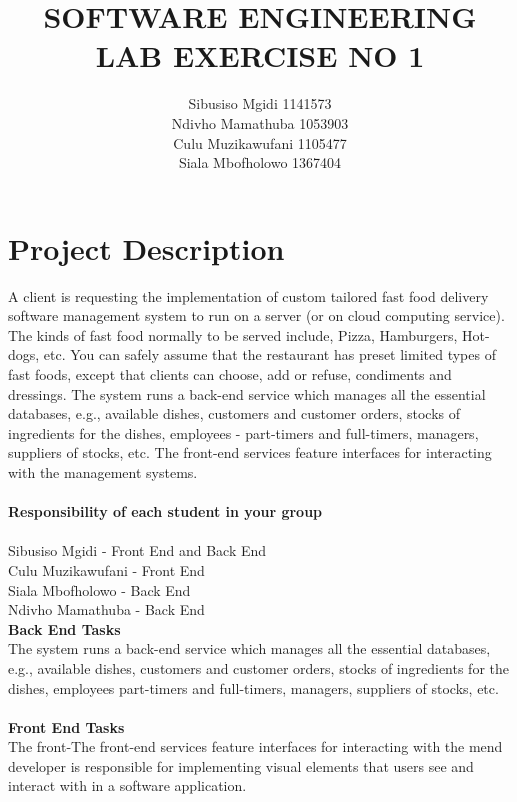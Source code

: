 \documentclass[11pt]{article}
\title{\textbf{SOFTWARE ENGINEERING LAB EXERCISE NO 1}}
\author{\Large Sibusiso Mgidi 1141573\\
		\Large Ndivho Mamathuba 1053903\\
		\Large Culu Muzikawufani 1105477\\	
		\Large Siala Mbofholowo 1367404\\
		}
\date{}
\begin{document}

\section{Project Description}

\Large A client is requesting the implementation of custom tailored fast food delivery software management
system to run on a server (or on cloud computing service). The kinds of fast food
normally to be served include, Pizza, Hamburgers, Hot-dogs, etc. You can safely assume that
the restaurant has preset limited types of fast foods, except that clients can choose, add or refuse, condiments and dressings.
The system runs a back-end service which manages all the essential databases, e.g., available
dishes, customers and customer orders, stocks of ingredients for the dishes, employees -
part-timers and full-timers, managers, suppliers of stocks, etc. The front-end services feature
interfaces for interacting with the management systems.\\
\\
\textbf{Responsibility of each student in your group}\\
\\
Sibusiso Mgidi - Front End and Back End\\
Culu Muzikawufani - Front End \\
Siala Mbofholowo - Back End \\
Ndivho Mamathuba - Back End \\

\textbf {Back End Tasks }\\
 The system runs a back-end service which manages all the essential databases, e.g., available dishes, customers and customer orders, stocks of ingredients for the dishes, employees part-timers and full-timers, managers, suppliers of stocks, etc.\\
\\

\textbf{Front End Tasks} \\
The front-The front-end services feature interfaces for interacting with the mend developer is responsible for implementing visual elements that users see and interact with in a software application.\\
\\
\end{document}
